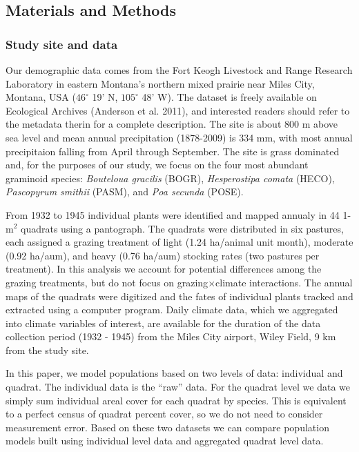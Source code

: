 \documentclass[12pt,]{article}
\begin{document}
\subsection{Materials and Methods}\label{materials-and-methods}

\subsubsection{Study site and data}\label{study-site-and-data}

Our demographic data comes from the Fort Keogh Livestock and Range
Research Laboratory in eastern Montana's northern mixed prairie near
Miles City, Montana, USA ($46^{\circ}$ 19' N, $105^{\circ}$ 48' W). The
dataset is freely available on Ecological Archives (Anderson et al.
2011), and interested readers should refer to the metadata therin for a
complete description. The site is about 800 m above sea level and mean
annual precipitation (1878-2009) is 334 mm, with most annual
precipitaion falling from April through September. The site is grass
dominated and, for the purposes of our study, we focus on the four most
abundant graminoid species: \emph{Bouteloua gracilis} (BOGR),
\emph{Hesperostipa comata} (HECO), \emph{Pascopyrum smithii} (PASM), and
\emph{Poa secunda} (POSE).

From 1932 to 1945 individual plants were identified and mapped annualy
in 44 1-$\text{m}^2$ quadrats using a pantograph. The quadrats were
distributed in six pastures, each assigned a grazing treatment of light
(1.24 ha/animal unit month), moderate (0.92 ha/aum), and heavy (0.76
ha/aum) stocking rates (two pastures per treatment). In this analysis we
account for potential differences among the grazing treatments, but do
not focus on grazing$\times$climate interactions. The annual maps of the
quadrats were digitized and the fates of individual plants tracked and
extracted using a computer program. Daily climate data, which we
aggregated into climate variables of interest, are available for the
duration of the data collection period (1932 - 1945) from the Miles City
airport, Wiley Field, 9 km from the study site.

In this paper, we model populations based on two levels of data:
individual and quadrat. The individual data is the ``raw'' data. For the
quadrat level we data we simply sum individual areal cover for each
quadrat by species. This is equivalent to a perfect census of quadrat
percent cover, so we do not need to consider measurement error. Based on
these two datasets we can compare population models built using
individual level data and aggregated quadrat level data.
\end{document}
